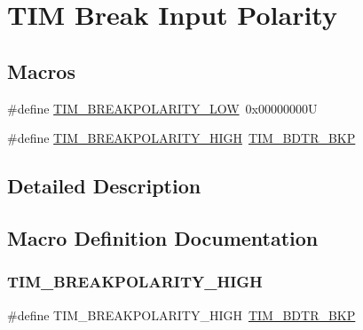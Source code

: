 \hypertarget{group___t_i_m___break___polarity}{}\section{T\+IM Break Input Polarity}
\label{group___t_i_m___break___polarity}
\subsection*{Macros}
\begin{DoxyCompactItemize}
\item 
\#define \mbox{\hyperlink{group___t_i_m___break___polarity_ga3e07cb0376c1bf561341dc8befb66208}{T\+I\+M\+\_\+\+B\+R\+E\+A\+K\+P\+O\+L\+A\+R\+I\+T\+Y\+\_\+\+L\+OW}}~0x00000000U
\item 
\#define \mbox{\hyperlink{group___t_i_m___break___polarity_ga97c30f1134accd61e3e42ce37e472700}{T\+I\+M\+\_\+\+B\+R\+E\+A\+K\+P\+O\+L\+A\+R\+I\+T\+Y\+\_\+\+H\+I\+GH}}~\mbox{\hyperlink{group___peripheral___registers___bits___definition_ga3247abbbf0d00260be051d176d88020e}{T\+I\+M\+\_\+\+B\+D\+T\+R\+\_\+\+B\+KP}}
\end{DoxyCompactItemize}


\subsection{Detailed Description}


\subsection{Macro Definition Documentation}
\mbox{\label{group___t_i_m___break___polarity_ga97c30f1134accd61e3e42ce37e472700}} 
\subsubsection{\texorpdfstring{TIM\_BREAKPOLARITY\_HIGH}{TIM\_BREAKPOLARITY\_HIGH}}
{\footnotesize\ttfamily \#define T\+I\+M\+\_\+\+B\+R\+E\+A\+K\+P\+O\+L\+A\+R\+I\+T\+Y\+\_\+\+H\+I\+GH~\mbox{\hyperlink{group___peripheral___registers___bits___definition_ga3247abbbf0d00260be051d176d88020e}{T\+I\+M\+\_\+\+B\+D\+T\+R\+\_\+\+B\+KP}}}

